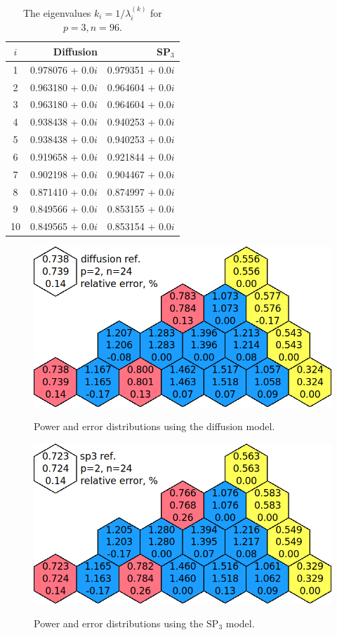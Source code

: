 \documentclass[authoryear]{elsarticle}
\begin{document}
\begin{table}[h]
\caption{The eigenvalues $k_i=1/\lambda_i^{(k)}$ for $p=3, n=96$.}
\label{tab:iaea_without_lambda_10}
\begin{center}
\begin{tabular}{c r r}
\hline
$i$ & Diffusion & SP$_3$  \\
\hline
1 & 0.978076 + 0.0$i$ & 0.979351 + 0.0$i$\\
2 & 0.963180 + 0.0$i$ & 0.964604 + 0.0$i$\\
3 & 0.963180 + 0.0$i$ & 0.964604 + 0.0$i$\\
4 & 0.938438 + 0.0$i$ & 0.940253 + 0.0$i$\\
5 & 0.938438 + 0.0$i$ & 0.940253 + 0.0$i$\\
6 & 0.919658 + 0.0$i$ & 0.921844 + 0.0$i$\\
7 & 0.902198 + 0.0$i$ & 0.904467 + 0.0$i$\\
8 & 0.871410 + 0.0$i$ & 0.874997 + 0.0$i$\\
9 & 0.849566 + 0.0$i$ & 0.853155 + 0.0$i$\\
10 & 0.849565 + 0.0$i$ & 0.853154 + 0.0$i$\\
\hline
\end{tabular}
\end{center}
\end{table}

\begin{figure}[H]
\begin{center}
	\includegraphics[width=0.75\linewidth]{diff_without_p2n24.png}\\
	\caption{Power and error distributions using the diffusion model.}
	\label{fig:power_iaea_without_dif}
\end{center}
\end{figure}
\begin{figure}[H]
\begin{center}
	\includegraphics[width=0.75\linewidth]{sp3_without_p2n24.png}\\
	\caption{Power and error distributions using the $\mathrm{SP_3}$ model.}
	\label{fig:power_ieae_without_sp3}
\end{center}
\end{figure}
\end{document}
